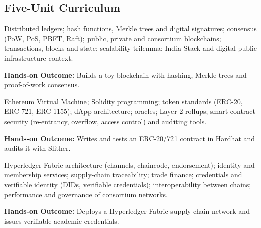 \documentclass[10pt,a4paper]{article}
\begin{document}
\subsection*{Five-Unit Curriculum}
\begin{tcolorbox}[unitbox,title={{\color{gold}UNIT I}\quad Blockchain Foundations\hfill{\color{gold}9 Hours}}]\small Distributed ledgers; hash functions, Merkle trees and digital signatures; consensus (PoW, PoS, PBFT, Raft); public, private and consortium blockchains; transactions, blocks and state; scalability trilemma; India Stack and digital public infrastructure context.\par\vspace{2pt}\par\textbf{Hands-on Outcome:} Builds a toy blockchain with hashing, Merkle trees and proof-of-work consensus.\end{tcolorbox}
\begin{tcolorbox}[unitbox,title={{\color{gold}UNIT II}\quad Smart Contracts and Decentralised Applications\hfill{\color{gold}9 Hours}}]\small Ethereum Virtual Machine; Solidity programming; token standards (ERC-20, ERC-721, ERC-1155); dApp architecture; oracles; Layer-2 rollups; smart-contract security (re-entrancy, overflow, access control) and auditing tools.\par\vspace{2pt}\par\textbf{Hands-on Outcome:} Writes and tests an ERC-20/721 contract in Hardhat and audits it with Slither.\end{tcolorbox}
\begin{tcolorbox}[unitbox,title={{\color{gold}UNIT III}\quad Enterprise and Permissioned Blockchains\hfill{\color{gold}9 Hours}}]\small Hyperledger Fabric architecture (channels, chaincode, endorsement); identity and membership services; supply-chain traceability; trade finance; credentials and verifiable identity (DIDs, verifiable credentials); interoperability between chains; performance and governance of consortium networks.\par\vspace{2pt}\par\textbf{Hands-on Outcome:} Deploys a Hyperledger Fabric supply-chain network and issues verifiable academic credentials.\end{tcolorbox}
\end{document}
